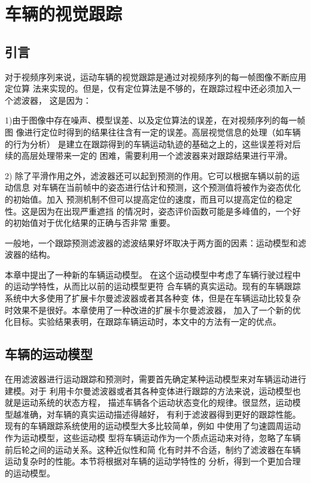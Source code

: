 \chapter{车辆的视觉跟踪}
\label{chap5}
\section{引言}
对于视频序列来说，运动车辆的视觉跟踪是通过对视频序列的每一帧图像不断应用定位算
法来实现的。但是，仅有定位算法是不够的，在跟踪过程中还必须加入一个滤波器，
这是因为：

1)由于图像中存在噪声、模型误差、以及定位算法的误差，在对视频序列的每一帧图
像进行定位时得到的结果往往含有一定的误差。高层视觉信息的处理（如车辆的行为分析）
是建立在跟踪得到的车辆运动轨迹的基础之上的，这些误差将对后续的高层处理带来一定的
困难，需要利用一个滤波器来对跟踪结果进行平滑。

2) 除了平滑作用之外，滤波器还可以起到预测的作用。它可以根据车辆以前的运动信息
对车辆在当前帧中的姿态进行估计和预测，这个预测值将被作为姿态优化的初始值。加入
预测机制不但可以提高定位的速度，而且可以提高定位的稳定性。这是因为在出现严重遮挡
的情况时，姿态评价函数可能是多峰值的，一个好的初始值对于优化结果的正确与否非常
重要。

一般地，一个跟踪预测滤波器的滤波结果好坏取决于两方面的因素：运动模型和滤波器的结构。

本章中提出了一种新的车辆运动模型。
在这个运动模型中考虑了车辆行驶过程中的运动学特性，从而比以前的运动模型更符
合车辆的真实运动。现有的车辆跟踪系统中大多使用了扩展卡尔曼滤波器或者其各种变
体，但是在车辆运动比较复杂时效果不是很好。本章使用了一种改进的扩展卡尔曼滤波器，
加入了一个新的优化目标。实验结果表明，在跟踪车辆运动时，本文中的方法有一定的优点。

\section{车辆的运动模型}
在用滤波器进行运动跟踪和预测时，需要首先确定某种运动模型来对车辆运动进行建模。对于
利用卡尔曼滤波器或者其各种变体进行跟踪的方法来说，运动模型也就是运动系统的状态方程，
描述车辆各个运动状态变化的规律。很显然，运动模型越准确，对车辆的真实运动描述得越好，
有利于滤波器得到更好的跟踪性能。现有的车辆跟踪系统使用的运动模型大多比较简单，例如
\cite{Koller:1993}\cite{Maybank:1996}中使用了匀速圆周运动作为运动模型，这些运动模
型将车辆运动作为一个质点运动来对待，忽略了车辆前后轮之间的运动关系。这种近似性和简
化有时并不合适，制约了滤波器在车辆运动复杂时的性能。本节将根据对车辆的运动学特性的
分析，得到一个更加合理的运动模型。
